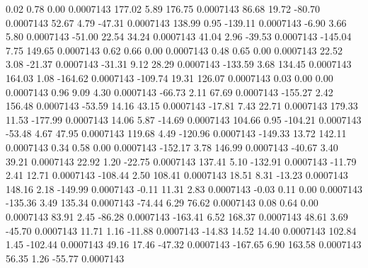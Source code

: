         0.02        0.78        0.00     0.0007143
      177.02        5.89      176.75     0.0007143
       86.68       19.72      -80.70     0.0007143
       52.67        4.79      -47.31     0.0007143
      138.99        0.95     -139.11     0.0007143
       -6.90        3.66        5.80     0.0007143
      -51.00       22.54       34.24     0.0007143
       41.04        2.96      -39.53     0.0007143
     -145.04        7.75      149.65     0.0007143
        0.62        0.66        0.00     0.0007143
        0.48        0.65        0.00     0.0007143
       22.52        3.08      -21.37     0.0007143
      -31.31        9.12       28.29     0.0007143
     -133.59        3.68      134.45     0.0007143
      164.03        1.08     -164.62     0.0007143
     -109.74       19.31      126.07     0.0007143
        0.03        0.00        0.00     0.0007143
        0.96        9.09        4.30     0.0007143
      -66.73        2.11       67.69     0.0007143
     -155.27        2.42      156.48     0.0007143
      -53.59       14.16       43.15     0.0007143
      -17.81        7.43       22.71     0.0007143
      179.33       11.53     -177.99     0.0007143
       14.06        5.87      -14.69     0.0007143
      104.66        0.95     -104.21     0.0007143
      -53.48        4.67       47.95     0.0007143
      119.68        4.49     -120.96     0.0007143
     -149.33       13.72      142.11     0.0007143
        0.34        0.58        0.00     0.0007143
     -152.17        3.78      146.99     0.0007143
      -40.67        3.40       39.21     0.0007143
       22.92        1.20      -22.75     0.0007143
      137.41        5.10     -132.91     0.0007143
      -11.79        2.41       12.71     0.0007143
     -108.44        2.50      108.41     0.0007143
       18.51        8.31      -13.23     0.0007143
      148.16        2.18     -149.99     0.0007143
       -0.11       11.31        2.83     0.0007143
       -0.03        0.11        0.00     0.0007143
     -135.36        3.49      135.34     0.0007143
      -74.44        6.29       76.62     0.0007143
        0.08        0.64        0.00     0.0007143
       83.91        2.45      -86.28     0.0007143
     -163.41        6.52      168.37     0.0007143
       48.61        3.69      -45.70     0.0007143
       11.71        1.16      -11.88     0.0007143
      -14.83       14.52       14.40     0.0007143
      102.84        1.45     -102.44     0.0007143
       49.16       17.46      -47.32     0.0007143
     -167.65        6.90      163.58     0.0007143
       56.35        1.26      -55.77     0.0007143
